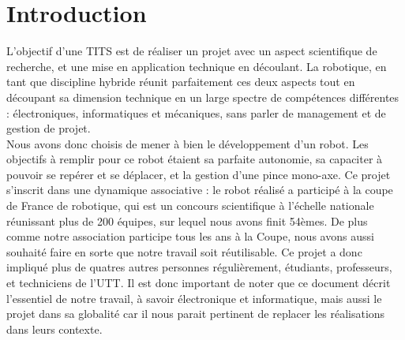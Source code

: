 \chapter{Introduction}
    L’objectif d’une TITS est de réaliser un projet avec un aspect scientifique de recherche, et une mise en application technique en découlant. La robotique, en tant que discipline hybride réunit parfaitement ces deux aspects tout en découpant sa dimension technique en un large spectre de compétences différentes : électroniques, informatiques et mécaniques, sans parler de management et de gestion de projet.\\

    Nous avons donc choisis de mener à bien le développement d’un robot. Les objectifs à remplir pour ce robot étaient sa parfaite autonomie, sa capaciter à pouvoir se repérer et se déplacer, et la gestion d’une pince mono-axe. Ce projet s’inscrit dans une dynamique associative : le robot réalisé a participé à la coupe de France de robotique, qui est un concours scientifique à l’échelle nationale réunissant plus de 200 équipes, sur lequel nous avons finit 54èmes. De plus comme notre association participe tous les ans à la Coupe, nous avons aussi souhaité faire en sorte que notre travail soit réutilisable. Ce projet a donc impliqué plus de quatres autres personnes régulièrement, étudiants, professeurs, et techniciens de l’UTT. Il est donc important de noter que ce document décrit l’essentiel de notre travail, à savoir électronique et informatique, mais aussi le projet dans sa globalité car il nous parait pertinent de replacer les réalisations dans leurs contexte.